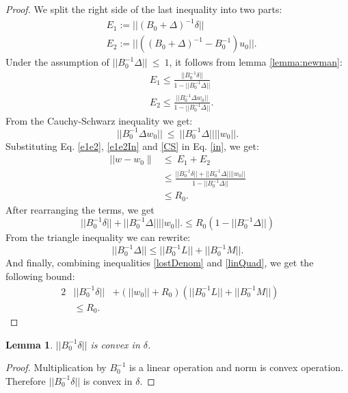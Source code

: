 \documentclass{sig-alternate-05-2015}
\newtheorem{lemma}{Lemma}
\begin{document}
\begin{proof}
We split the right side of the last inequality into two parts:
\begin{equation}  \label{e1e2}
\begin{split}
& E_1:= ||(B_0+\Delta)^{-1}\delta|| \\
& E_2:= ||((B_0+\Delta)^{-1} - B_0^{-1})u_0||.
\end{split}
\end{equation}
Under the assumption of $||B_0^{-1}\Delta||\ \leq \ 1$, 
it follows from lemma \ref{lemma:newman}:
\begin{equation} \label{e1e2In}
\begin{split}
& E_1 \leq \frac{||B_0^{-1}\delta||}{1-||B_0^{-1}\Delta||} \\
& E_2 \leq  \frac{|| B_0^{-1}\Delta w_0||}{1-||B_0^{-1}\Delta||}.
\end{split}
\end{equation}
From the Cauchy-Schwarz inequality we get:
\begin{equation} \label{CS}
||B_0^{-1}\Delta w_0|| \ \leq \ ||B_0^{-1}\Delta||||w_0||.
\end{equation}
Substituting Eq. \ref{e1e2}, \ref{e1e2In} and \ref{CS} in Eq. \ref{in}, we
get:
\begin{equation}
\begin{split}
|| w-w_0 \parallel & \leq \ E_1+E_2 \\
& \leq \frac{||B_0^{-1}\delta|| + ||B_0^{-1}\Delta||||w_0||}{1 -||B_0^{-1}\Delta||} \\
& \leq R_0.
\end{split}
\end{equation}
After rearranging the terms, we get
\begin{equation} \label{lostDenom}
||B_0^{-1}\delta|| + ||B_0^{-1}\Delta||||w_0||.
\leq R_0(1 -||B_0^{-1}\Delta||)
\end{equation}
From the triangle inequality we can rewrite:
\begin{equation} \label{linQuad}
||B_0^{-1}\Delta|| \leq ||B_0^{-1}L||+||B_0^{-1}M||.
\end{equation}
And finally, combining inequalities \ref{lostDenom} and \ref{linQuad},
we get the following bound:
\begin{alignat*}{2} \label{convexBound}
&||B_0^{-1}\delta|| &+ (||w_0||+R_0)(||B_0^{-1}L||+||B_0^{-1}M||) && \\ 
& \leq R_0. &&
\end{alignat*}
\end{proof}

\begin{lemma} \label{delta}
$||B_0^{-1}\delta||$ is convex in $\delta$.
\end{lemma}
\begin{proof}
Multiplication by $B_0^{-1}$ is a linear operation and norm is convex
operation. Therefore $||B_0^{-1}\delta||$ is convex in $\delta$.
\end{proof}
\end{document}
